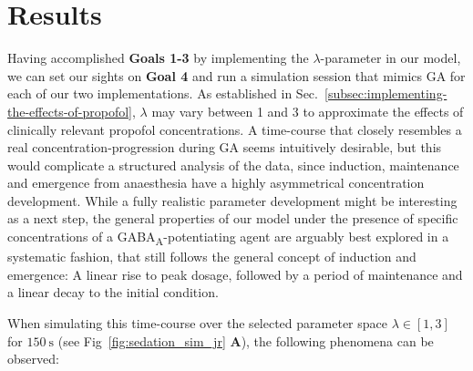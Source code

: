 \chapter{Results}\label{ch:results}
Having accomplished \textbf{Goals 1-3} by implementing the $\lambda$-parameter in our model,
we can set our sights on \textbf{Goal 4} and run a simulation session that mimics GA for each of our two implementations.
As established in Sec.~\ref{subsec:implementing-the-effects-of-propofol},
$\lambda$ may vary between 1 and 3 to approximate the effects of clinically relevant propofol concentrations.
A time-course that closely resembles a real concentration-progression during GA seems intuitively desirable,
but this would complicate a structured analysis of the data, since induction, maintenance and emergence from anaesthesia
have a highly asymmetrical concentration development.
While a fully realistic parameter development might be interesting as a next step,
the general properties of our model under the presence of specific
concentrations of a GABA\textsubscript{A}-potentiating agent
are arguably best explored in a systematic fashion, that still follows the general concept of induction and emergence:
A linear rise to peak dosage, followed by a period of maintenance and a linear decay to the initial condition.


When simulating this time-course over the selected parameter space
$ \lambda \in \left[ 1, 3 \right] $ for $\SI{150}{\second}$ (see Fig~\ref{fig:sedation_sim_jr} \textbf{A}),
the following phenomena can be observed:

\newtoggle{drawLocRoc}

\toggletrue{drawLocRoc}
\def\simRunName{JR_SEDATION_150}
\def\simRunTime{151}
\def\locStart{1.1}
\def\locST{10.07}%
\def\locEnd{2.07}
\def\locET{40.38}%
\def\rocStart{2.0}
\def\rocST{112.88}%
\def\rocEnd{1.00}
\def\rocET{144.46}%
